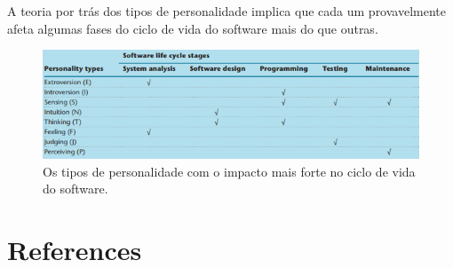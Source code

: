 \documentclass[12pt]{article}
\begin{document}
A teoria por trás dos tipos de personalidade implica que cada um provavelmente afeta algumas fases do ciclo de vida do software mais do que outras. 

\begin{figure}[!ht]
\centering
\includegraphics[width=.7\textwidth]{Capturar6.PNG}
\caption{Os tipos de personalidade com o impacto mais forte no ciclo de vida do software.}
\label{fig:figura6}
\end{figure}
\newpage
\section{References}



\end{document}
